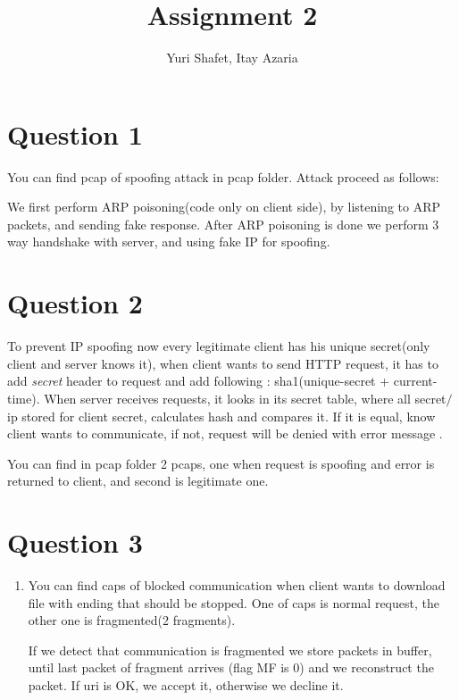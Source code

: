 \documentclass{report}
\begin{document}
\author{Yuri Shafet, Itay Azaria}
\title{Assignment 2}
\maketitle

\section*{Question 1}
You can find pcap of spoofing attack in pcap folder.
Attack proceed as follows:

We first perform ARP poisoning(code only on client side), by listening to ARP packets, and sending fake response. After ARP poisoning is done we perform 3 way handshake with server, and using fake IP for spoofing.

\section*{Question 2}

To prevent IP spoofing now every legitimate client has his unique secret(only client and server knows it), when client wants to send HTTP request, it has to add \emph{secret} header to request and add following : sha1(unique-secret + current-time). When server receives requests, it looks in its secret table, where all secret$/$ip stored for client secret,  calculates hash and compares it. If it is equal, know client wants to communicate, if not, request will be denied with error message .

You can find in pcap folder 2 pcaps, one when request is spoofing and error is returned to client, and second is legitimate one.

\section*{Question 3}
\begin{enumerate}
\item 
	You can find caps of blocked communication when client wants to download file with ending that should be stopped. One of caps is normal request, the other one is fragmented(2 fragments).
	
	If we detect that communication is fragmented we store packets in buffer, until last packet of fragment arrives (flag MF is 0) and we reconstruct the packet. If uri is OK, we accept it, otherwise we decline it.

\end{enumerate}
\end{document}
